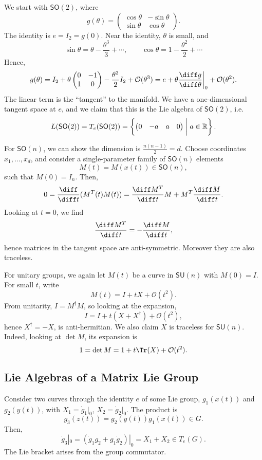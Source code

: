 \documentclass[12pt]{article}
\begin{document}
We start with $\mathsf{SO}(2)$, where
\[
g(\theta) =
\begin{pmatrix}
	\cos \theta & -\sin \theta \\
	\sin \theta & \cos \theta
\end{pmatrix}.
\]
The identity is $e = I_2 = g(0)$. Near the identity, $\theta$ is small, and
\[
\sin \theta = \theta - \frac{\theta^3}{3} + \cdots, \qquad \cos \theta = 1 - \frac{\theta^2}{2} + \cdots
\]
Hence,
\[
g(\theta) = I_2 + \theta
\begin{pmatrix}
	0 & -1 \\ 1 & 0
\end{pmatrix} - \frac{\theta^2}{2} I_2 + \mathcal{O}(\theta^3) = e + \theta \frac{\diff g}{\diff \theta} \biggr|_{0} + \mathcal{O}(\theta^2).
\]
The linear term is the ``tangent'' to the manifold. We have a one-dimensional tangent space at $e$, and we claim that this is the Lie algebra of $\mathsf{SO}(2)$, i.e.
\[
L(\mathsf{SO}(2)) = T_e(\mathsf{SO}(2)) = \left\{
	\begin{pmatrix}
		0 & -a & a & 0
	\end{pmatrix}
\biggm| a \in \mathbb{R} \right\}.
\]

For $\mathsf{SO}(n)$, we can show the dimension is $\frac{n(n-1)}{2} = d$. Choose coordinates $x_1, \ldots, x_d$, and consider a single-parameter family of $\mathsf{SO}(n)$ elements
\[
M(t) = M(x(t)) \in \mathsf{SO}(n),
\]
such that $M(0) = I_n$. Then,
\[
0 = \frac{\diff}{\diff t} (M^T(t) M(t)) = \frac{\diff M^T}{\diff t} M + M^T \frac{\diff M}{\diff t}.
\]
Looking at $t = 0$, we find
\[
\frac{\diff M^T}{\diff t} = - \frac{\diff M}{\diff t},
\]
hence matrices in the tangent space are anti-symmetric. Moreover they are also traceless.


For unitary groups, we again let $M(t)$ be a curve in $\mathsf{SU}(n)$ with $M(0) = I$. For small $t$, write
\[
M(t) = I + t X + \mathcal{O}(t^2).
\]
From unitarity, $I = M^{\dagger} M$, so looking at the expansion,
\[
I = I + t(X + X^\dagger) + \mathcal{O}(t^2),
\]
hence $X^\dagger = -X$, is anti-hermitian. We also claim $X$ is traceless for $\mathsf{SU}(n)$. Indeed, looking at $\det M$, its expansion is
\[
1 = \det M = 1 + t \Tr(X) + \mathcal{O}(t^2).
\]
\subsection{Lie Algebras of a Matrix Lie Group}%
\label{sub:la_mlg}

Consider two curves through the identity $e$ of some Lie group, $g_1(x(t))$ and $g_2(y(t))$, with $X_1 = \dot g_1|_0$, $X_2 = \dot g_2|_0$. The product is
\[
g_3(z(t)) = g_2(y(t)) g_1(x(t)) \in G.
\]
Then,
\[
\dot g_3|_0 = (\dot g_1 g_2 + g_1 \dot g_2)|_0 = X_1 + X_2 \in T_e(G).
\]
The Lie bracket arises from the group commutator.
\end{document}
